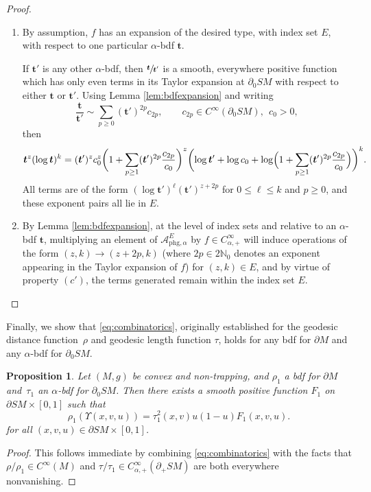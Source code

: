 \documentclass[JEP,XML,SOM,Unicode,NoFloatCountersInSection, NoEqCountersInSection,published]{cedram}
\newenvironment{enumeratea}
{\bgroup\def\theenumi{\alph{enumi}}\begin{enumerate}}
{\end{enumerate}\egroup}
\theoremstyle{plain}
\newtheorem{Proposition}[Theorem]{Proposition}
\theoremstyle{definition}
\theoremstyle{remark}
\def\Nm{{\mathbb{N}}}
\def\A{\mathcal{A}}
\newcommand{\bt}{{\boldsymbol{t}}}
\newcommand{\del}{\partial}
\newcommand{\phg}{\mathrm{phg}}
\begin{document}
\skpt
\begin{proof}
\begin{enumeratea}
\item
By assumption, $f$ has an expansion of the desired type, with index set $E$, with respect to one particular $\alpha$-bdf $\bt$.

If $\bt'$ is any other $\alpha$-bdf, then $\sfrac{\bt}{\bt'}$ is a smooth, everywhere positive function which has only even terms in its Taylor expansion at $\del_0 SM$ with respect to either $\bt$ or $\bt'$. Using Lemma \ref{lem:bdfexpansion} and writing\vspace*{-3pt}\enlargethispage{.5\baselineskip}
\begin{equation*}
\frac{\bt}{\bt'} \sim \sum_{p\ge 0} (\bt')^{2p} c_{2p}, \qquad c_{2p}\in C^\infty(\partial_0 SM), \ \ c_0 > 0,
\end{equation*}
then\vspace*{-5pt}
\begin{equation*}
\bt^z (\log \bt)^k = (\bt')^z c^z_0 \biggl(1 + \sum_{p\ge 1} (\bt')^{2p} \frac{c_{2p}}{c_0} \biggr)^z \biggl(\log \bt' + \log c_0 + \log \Bigl(1 + \sum_{p\ge 1} (\bt')^{2p} \frac{c_{2p}}{c_0} \Bigr)\biggr)^k.
\end{equation*}
All terms are of the form $(\log \bt')^{\ell} (\bt')^{z+2p}$ for $0\le \ell \le k$ and $p\ge 0$, and these exponent pairs all lie in $E$.

\item
By Lemma \ref{lem:bdfexpansion}, at the level of index sets and relative to an $\alpha$-bdf $\bt$, multiplying an element of $\A_{\phg,\alpha}^E$ by $f\in C_{\alpha,+}^\infty$ will induce operations of the form $(z,k)\to (z+2p,k)$ (where $2p\in 2\Nm_0$ denotes an exponent appearing in the Taylor expansion of $f$) for $(z,k)\in E$, and by virtue of property $(c')$, the terms generated remain within the index set $E$.\qedhere
\end{enumeratea}
\end{proof}

Finally, we show that \eqref{eq:combinatorics}, originally established for the geodesic distance function~$\rho$
and geodesic length function $\tau$, holds for any bdf for $\del M$ and any $\alpha$-bdf for $\partial_0 SM$.

\begin{Proposition}\label{prop:combinatorics2}
Let $(M,g)$ be convex and non-trapping, and $\rho_1$ a bdf for $\partial M$ and~$\tau_1$ an $\alpha$-bdf for $\partial_0 SM$.
Then there exists a smooth positive function $F_1$ on $\del SM\times [0,1]$ such that
\begin{equation*}
\rho_1 (\Upsilon(x,v,u)) = \tau_1^2 (x,v) u(1-u) F_1(x,v,u).
\end{equation*}
for all $(x,v,u)\in \partial SM\times [0,1]$.
\end{Proposition}
\begin{proof}
This follows immediate by combining \eqref{eq:combinatorics} with the facts that $\rho/\rho_1 \in C^\infty(M)$
and $\tau/\tau_1\in C_{\alpha,+}^\infty(\partial_+ SM)$ are both everywhere nonvanishing.
\end{proof}
\end{document}
